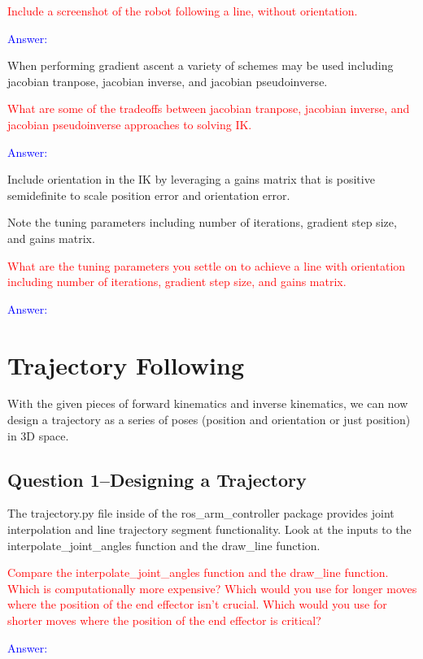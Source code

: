 \documentclass[11pt,a4paper]{article}
\begin{document}
\textcolor{red}{Include a screenshot of the robot following a line, without orientation.}

\textcolor{blue}{Answer: }

When performing gradient ascent a variety of schemes may be used including jacobian tranpose, jacobian inverse, and jacobian pseudoinverse.

\textcolor{red}{What are some of the tradeoffs between jacobian tranpose, jacobian inverse, and jacobian pseudoinverse approaches to solving IK.}

\textcolor{blue}{Answer: }

Include orientation in the IK by leveraging a gains matrix that is positive semidefinite to scale position error and orientation error.

Note the tuning parameters including number of iterations, gradient step size, and gains matrix.

\textcolor{red}{What are the tuning parameters you settle on to achieve a line with orientation including number of iterations, gradient step size, and gains matrix.}

\textcolor{blue}{Answer: }

\clearpage
\section{Trajectory Following}

With the given pieces of forward kinematics and inverse kinematics, we can now design a trajectory as a series of poses (position and orientation or just position) in 3D space.

\subsection{Question 1--Designing a Trajectory}

The trajectory.py file inside of the ros\_arm\_controller package provides joint interpolation and line trajectory segment functionality. Look at the inputs to the interpolate\_joint\_angles function and the draw\_line function. 

\textcolor{red}{Compare the interpolate\_joint\_angles function and the draw\_line function. Which is computationally more expensive? Which would you use for longer moves where the position of the end effector isn't crucial. Which would you use for shorter moves where the position of the end effector is critical?}

\textcolor{blue}{Answer: }
\end{document}
